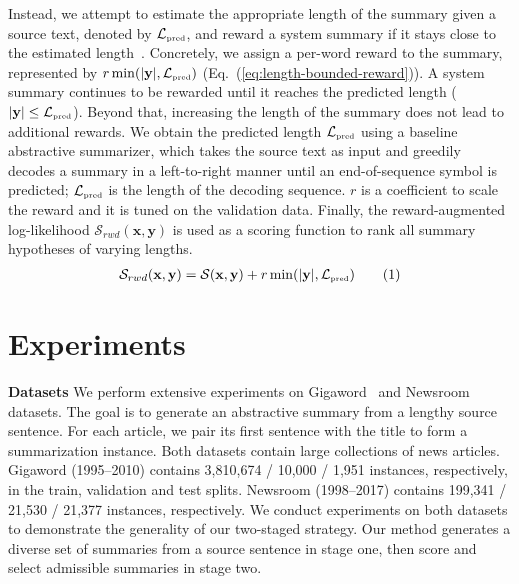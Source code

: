\documentclass[11pt]{article}
\newcommand\numberthis{\addtocounter{equation}{1}\tag{\theequation}}
\begin{document}
Instead, we attempt to estimate the appropriate length of the summary given a source text, denoted by $\mathcal{L}_{\mbox{\tiny pred}}$, and reward a system summary if it stays close to the estimated length~\cite{huang-etal-2017-finish}.
Concretely, we assign a per-word reward to the summary, represented by $r \min(|\mathbf{y}|, \mathcal{L}_{\mbox{\tiny pred}})$ (Eq.~(\ref{eq:length-bounded-reward})).
A system summary continues to be rewarded until it reaches the predicted length ($|\mathbf{y}| \le \mathcal{L}_{\mbox{\tiny pred}}$).
Beyond that, increasing the length of the summary does not lead to additional rewards. 
We obtain the predicted length $\mathcal{L}_{\mbox{\tiny pred}}$ using a baseline abstractive summarizer, which takes the source text as input and greedily decodes a summary in a left-to-right manner until an end-of-sequence symbol is predicted; $\mathcal{L}_{\mbox{\tiny pred}}$ is the length of the decoding sequence.
$r$ is a coefficient to scale the reward and it is tuned on the validation data.
Finally, the reward-augmented log-likelihood $\mathcal{S}_{rwd}(\mathbf{x},\mathbf{y})$ is used as a scoring function to rank all summary hypotheses of varying lengths.
\begin{align*}
\mathcal{S}_{rwd}(\mathbf{x},\mathbf{y}) = \mathcal{S}(\mathbf{x},\mathbf{y}) + r \min(|\mathbf{y}|, \mathcal{L}_{\mbox{\tiny pred}})
\numberthis\label{eq:length-bounded-reward}
\end{align*}


\section{Experiments}


\noindent\textbf{Datasets}\quad
We perform extensive experiments on Gigaword~\cite{Parker:2011} and Newsroom~\cite{grusky-etal-2018-newsroom} datasets.
The goal is to generate an abstractive summary from a lengthy source sentence.
For each article, we pair its first sentence with the title to form a summarization instance.
Both datasets contain large collections of news articles.
Gigaword (1995--2010) contains 3,810,674 / 10,000 / 1,951 instances, respectively, in the train, validation and test splits. Newsroom (1998--2017) contains 199,341 / 21,530 / 21,377 instances, respectively.
We conduct experiments on both datasets to demonstrate the generality of our two-staged strategy.
Our method generates a diverse set of summaries from a source sentence in stage one, then score and select admissible summaries in stage two.
\end{document}
